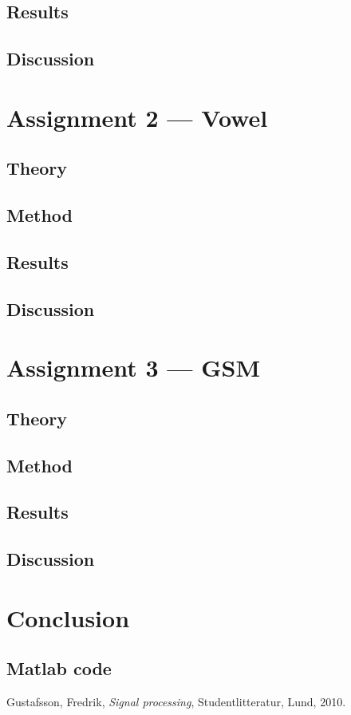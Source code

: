 \documentclass{IEEEtran}
\begin{document}
\subsection{Results}
\subsection{Discussion}

\section{Assignment 2 --- Vowel}

\subsection{Theory}
\subsection{Method}
\subsection{Results}
\subsection{Discussion}

\section{Assignment 3 --- GSM}

\subsection{Theory}
\subsection{Method}
\subsection{Results}
\subsection{Discussion}

\section{Conclusion}

\newpage
\begin{appendices}
    \section{Matlab code}
\end{appendices}

\begin{thebibliography}{9}

  Gustafsson, Fredrik,
  \textit{Signal processing},
  Studentlitteratur, Lund,
  2010.

\end{thebibliography}
\end{document}
